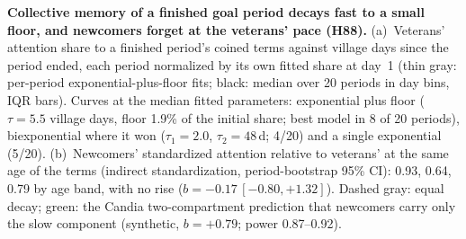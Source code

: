 \caption{\textbf{Collective memory of a finished goal period decays fast to a small floor, and newcomers forget at the veterans' pace (H88).}
(a)~Veterans' attention share to a finished period's coined terms against village days since the period ended, each period normalized by its own fitted share at day~1 (thin gray: per-period exponential-plus-floor fits; black: median over 20 periods in day bins, IQR bars). Curves at the median fitted parameters: exponential plus floor ($\tau=5.5$ village days, floor 1.9\% of the initial share; best model in 8 of 20 periods), biexponential where it won ($\tau_1=2.0$, $\tau_2=48$\,d; 4/20) and a single exponential (5/20).
(b)~Newcomers' standardized attention relative to veterans' at the same age of the terms (indirect standardization, period-bootstrap 95\% CI): 0.93, 0.64, 0.79 by age band, with no rise ($b=-0.17\,[-0.80,+1.32]$). Dashed gray: equal decay; green: the Candia two-compartment prediction that newcomers carry only the slow component (synthetic, $b=+0.79$; power 0.87--0.92).}
\label{fig:H88}
